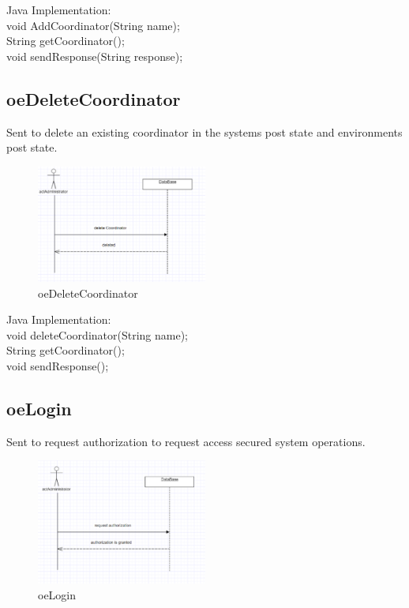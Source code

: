 \noindent Java Implementation:\\
void AddCoordinator(String name);\\
String getCoordinator();\\
void sendResponse(String response);\\

\subsection{oeDeleteCoordinator}
Sent to delete an existing coordinator in the systems post state and
environments post state.\\
\begin{figure}[H]
\begin{center}
\includegraphics[width=0.5\textwidth]{./images/oeDeleteCoordinator.eps} 
\end{center}
\caption{oeDeleteCoordinator}
\end{figure}

\noindent Java Implementation:\\
void deleteCoordinator(String name);\\
String getCoordinator();\\
void sendResponse();\\

\subsection{oeLogin}
Sent to request authorization to request access secured system operations.\\
\begin{figure}[H]
\begin{center}
\includegraphics[width=0.5\textwidth]{./images/oeLogin.eps} 
\end{center}
\caption{oeLogin}
\end{figure}

